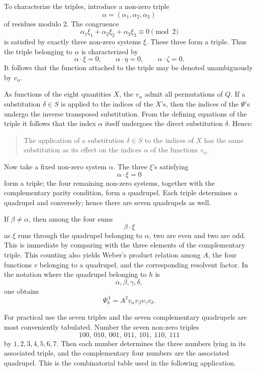 \documentclass[11pt,a4paper]{book}
\begin{document}
To characterize the triples, introduce a non-zero triple
\[
 \alpha=(\alpha_1,\alpha_2,\alpha_3)
\]
of residues modulo \(2\).  The congruence
\[
 \alpha_1\xi_1+\alpha_2\xi_2+\alpha_3\xi_3\equiv0\pmod2
\]
is satisfied by exactly three non-zero systems \(\xi\).  These three form a triple.  Thus the triple belonging to \(\alpha\) is characterized by
\[
 \alpha\cdot\xi=0,\qquad
 \alpha\cdot\eta=0,\qquad
 \alpha\cdot\zeta=0.
\]
It follows that the function attached to the triple may be denoted unambiguously by \(v_\alpha\).

As functions of the eight quantities \(X\), the \(v_\alpha\) admit all permutations of \(Q\).  If a substitution \(\delta\in S\) is applied to the indices of the \(X\)'s, then the indices of the \(\Psi\)'s undergo the inverse transposed substitution.  From the defining equations of the triple it follows that the index \(\alpha\) itself undergoes the direct substitution \(\delta\).  Hence:

\begin{quote}
The application of a substitution \(\delta\in S\) to the indices of \(X\) has the same substitution as its effect on the indices \(\alpha\) of the functions \(v_\alpha\).
\end{quote}

Now take a fixed non-zero system \(\alpha\).  The three \(\xi\)'s satisfying
\[
 \alpha\cdot\xi=0
\]
form a triple; the four remaining non-zero systems, together with the complementary parity condition, form a quadrupel.  Each triple determines a quadrupel and conversely; hence there are seven quadrupels as well.

If \(\beta\ne\alpha\), then among the four sums
\[
 \beta\cdot\xi
\]
as \(\xi\) runs through the quadrupel belonging to \(\alpha\), two are even and two are odd.  This is immediate by comparing with the three elements of the complementary triple.  This counting also yields Weber's product relation among \(A\), the four functions \(v\) belonging to a quadrupel, and the corresponding resolvent factor.  In the notation where the quadrupel belonging to \(h\) is
\[
 \alpha,\beta,\gamma,\delta,
\]
one obtains
\[
 \Psi_h^{\,4}=A^2v_\alpha v_\beta v_\gamma v_\delta .
\]

For practical use the seven triples and the seven complementary quadrupels are most conveniently tabulated.  Number the seven non-zero triples
\[
 100,\ 010,\ 001,\ 011,\ 101,\ 110,\ 111
\]
by \(1,2,3,4,5,6,7\).  Then each number determines the three numbers lying in its associated triple, and the complementary four numbers are the associated quadrupel.  This is the combinatorial table used in the following application.
\end{document}
